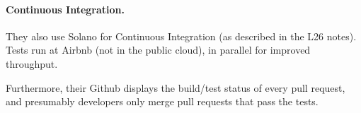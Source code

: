 \documentclass[11pt]{article}
\begin{document}
\paragraph{Continuous Integration.} They also use Solano for Continuous
Integration (as described in the L26 notes). Tests run at Airbnb (not
in the public cloud), in parallel for improved throughput.

Furthermore, their Github displays the build/test status of every pull
request, and presumably developers only merge pull requests that pass
the tests.
\end{document}
